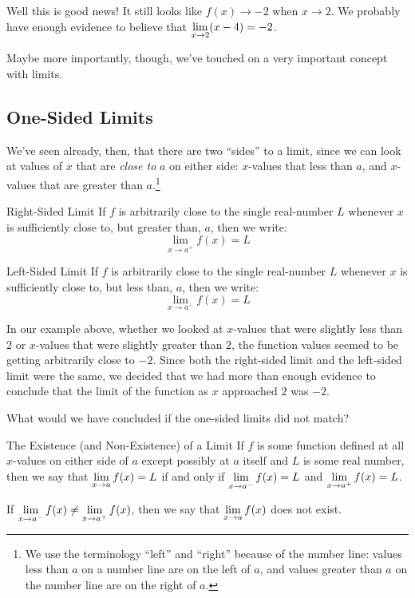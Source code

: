 Well this is good news! It still looks like $f(x) \to -2$ when $x\to 2$.
We probably have enough evidence to believe that $\displaystyle \lim_{x\to 2}(x-4) = -2$.

Maybe more importantly, though, we've touched on a very important concept with limits.

\subsection*{One-Sided Limits}

We've seen already, then, that there are two ``sides'' to a limit, since we can look at values of $x$ that are \textit{close to} $a$ on either side: $x$-values that less than $a$, and $x$-values that are greater than $a$.\footnote{We use the terminology ``left'' and ``right'' because of the number line: values less than $a$ on a number line are on the left of $a$, and values greater than $a$ on the number line are on the right of $a$.}

\begin{defn}{Right-Sided Limit}
  If $f$ is arbitrarily close to the single real-number $L$ whenever $x$ is sufficiently close to, but greater than, $a$, then we write:
  \[ \lim_{x\to a^+} f(x)=L\]
\end{defn}

\begin{defn}{Left-Sided Limit}
  If $f$ is arbitrarily close to the single real-number $L$ whenever $x$ is sufficiently close to, but less than, $a$, then we write:
  \[ \lim_{x\to a^-} f(x)=L\]
\end{defn}

In our example above, whether we looked at $x$-values that were slightly less than $2$ or $x$-values that were slightly greater than $2$, the function values seemed to be getting arbitrarily close to $-2$.
Since both the right-sided limit and the left-sided limit were the same, we decided that we had more than enough evidence to conclude that the limit of the function as $x$ approached $2$ was $-2$.

What would we have concluded if the one-sided limits did not match?

\begin{thm}{The Existence (and Non-Existence) of a Limit}
  If $f$ is some function defined at all $x$-values on either side of $a$ except possibly at $a$ itself and $L$ is some real number, then we say that $\displaystyle \lim_{x\to a} f(x) = L$ if and only if $\displaystyle \lim_{x\to a^-}f(x) = L$ and $\displaystyle \lim_{x\to a^+} f(x) = L$.

  If $\displaystyle \lim_{x\to a^-} f(x) \neq \displaystyle \lim_{x\to a^+} f(x)$, then we say that $\displaystyle \lim_{x\to a} f(x)$ does not exist.
\end{thm}

